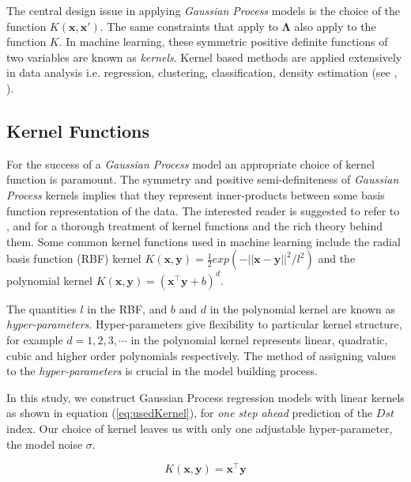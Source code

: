 \documentclass[draft,sw]{AGUTeX}
\begin{document}
\begin{article}
The central design issue in applying \emph{Gaussian Process} models is the choice of the function $K(\mathbf{x}, \mathbf{x}')$. The same constraints that apply to $\mathbf{\Lambda}$ also apply to the function $K$. In machine learning, these symmetric positive definite functions of two variables are known as \emph{kernels}. Kernel based methods are applied extensively in data analysis i.e. regression, clustering, classification, density estimation (see \citet{Scholkopf:2001:LKS:559923}, \citet{hofmann2008}).

\subsection{Kernel Functions}

For the success of a \emph{Gaussian Process} model an appropriate choice of kernel function is paramount. The symmetry and positive semi-definiteness of \emph{Gaussian Process} kernels implies that they represent inner-products between some basis function representation of the data. The interested reader is suggested to refer to \citet{Berlinet2004}, \citet{Scholkopf:2001:LKS:559923} and \citet{hofmann2008} for a thorough treatment of kernel functions and the rich theory behind them. Some common kernel functions used in machine learning include the radial basis function (RBF) kernel $K(\mathbf{x}, \mathbf{y}) = \frac{1}{2} exp(-||\mathbf{x} - \mathbf{y}||^2/l^2)$ and the polynomial kernel $K(\mathbf{x}, \mathbf{y}) = (\mathbf{x}^\intercal \mathbf{y} + b)^d$. 

The quantities $l$ in the RBF, and $b$ and $d$ in the polynomial kernel are known as \emph{hyper-parameters}. Hyper-parameters give flexibility to particular kernel structure, for example $d = 1, 2, 3, \cdots$ in the polynomial kernel represents linear, quadratic, cubic and higher order polynomials respectively. The method of assigning values to the \emph{hyper-parameters} is crucial in the model building process. 

In this study, we construct Gaussian Process regression models with linear kernels as shown in equation (\ref{eq:usedKernel}), for \emph{one step ahead} prediction of the $Dst$ index. Our choice of kernel leaves us with only one adjustable hyper-parameter, the model noise $\sigma$. 

\begin{equation}\label{eq:usedKernel}
    K(\mathbf{x}, \mathbf{y}) = \mathbf{x}^\intercal \mathbf{y}
\end{equation}


\end{article}
\end{document}
